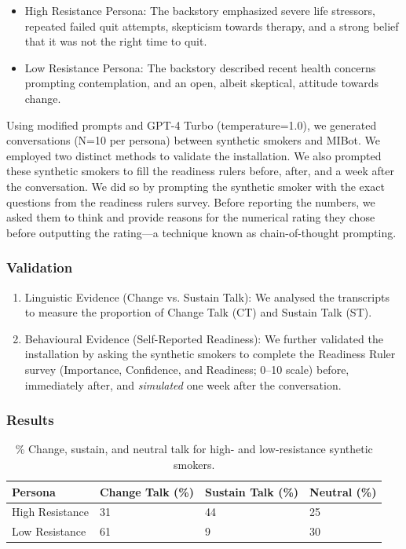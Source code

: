 \begin{itemize}
	\item High Resistance Persona: The backstory emphasized severe life stressors, repeated
	      failed quit attempts, skepticism towards therapy, and a strong belief that it was not
	      the right time to quit.
	\item Low Resistance Persona: The backstory described recent health concerns prompting
	      contemplation, and an open, albeit skeptical, attitude towards change.
\end{itemize}

Using modified prompts and GPT-4 Turbo (temperature=1.0), we generated conversations
(N=10 per persona) between synthetic smokers and MIBot. We employed two distinct
methods to validate the installation. We also prompted these synthetic smokers to fill
the readiness rulers before, after, and a week after the conversation. We did so by
prompting the synthetic smoker with the exact questions from the readiness rulers
survey. Before reporting the numbers, we asked them to think and provide reasons for
the numerical rating they chose before outputting the rating---a technique known as
chain-of-thought prompting.

\subsubsection{Validation}

\begin{enumerate}
	\item Linguistic Evidence (Change vs. Sustain Talk): We analysed the transcripts to measure
	      the proportion of Change Talk (CT) and Sustain Talk (ST).

	\item Behavioural Evidence (Self-Reported Readiness): We further validated the installation
	      by asking the synthetic smokers to complete the Readiness Ruler survey (Importance,
	      Confidence, and Readiness; 0--10 scale) before, immediately after, and \emph{simulated}
	      one week after the conversation.

\end{enumerate}

\subsubsection{Results}

\begin{table}[ht!]
	\centering
	\begin{tabular}{@{}llll@{}}
		\toprule
		\textbf{Persona} & \textbf{Change Talk (\%)} & \textbf{Sustain Talk (\%)} & \textbf{Neutral (\%)} \\ \midrule
		High Resistance  & 31                        & 44                         & 25                    \\
		Low Resistance   & 61                        & 9                          & 30                    \\ \bottomrule
	\end{tabular}
	\caption{\% Change, sustain, and neutral talk for high- and low-resistance synthetic smokers.}
	\label{tab:resistance-ct-st}
\end{table}

